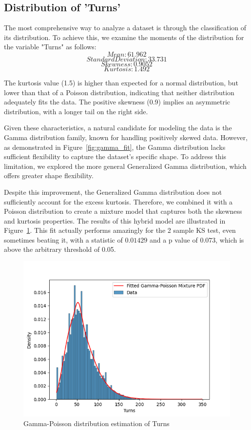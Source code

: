 \documentclass[conference]{IEEEtran}
\begin{document}
\subsection{Distribution of 'Turns'}

The most comprehensive way to analyze a dataset is through the classification of its distribution. To achieve this, we examine the moments of the distribution for the variable "Turns" as follows:
\[Mean: 61.962\]
\[Standard Deviation: 33.731\]
\[Skewness: 0.9052\]
\[Kurtosis: 1.492\]

The kurtosis value (1.5) is higher than expected for a normal distribution, but lower than that of a Poisson distribution, indicating that neither distribution adequately fits the data. The positive skewness (0.9) implies an asymmetric distribution, with a longer tail on the right side.

Given these characteristics, a natural candidate for modeling the data is the Gamma distribution family, known for handling positively skewed data. However, as demonstrated in Figure~\ref{fig:gamma_fit}, the Gamma distribution lacks sufficient flexibility to capture the dataset’s specific shape. To address this limitation, we explored the more general Generalized Gamma distribution, which offers greater shape flexibility.

Despite this improvement, the Generalized Gamma distribution does not sufficiently account for the excess kurtosis. Therefore, we combined it with a Poisson distribution to create a mixture model that captures both the skewness and kurtosis properties. The results of this hybrid model are illustrated in Figure~\ref{fig:gam_poi_fit}. This fit actually performs amazingly for the 2 sample KS test, even sometimes beating it, with a statistic of $0.01429$ and a p value of $0.073$, which is above the arbitrary threshold of 0.05.



\begin{figure}[H]
    \centering
    \includegraphics[width=0.8\linewidth]{gamma_poisson_fit.png}
    \caption{Gamma-Poisson distribution estimation of Turns}
    \label{fig:gam_poi_fit}
\end{figure}
\end{document}
